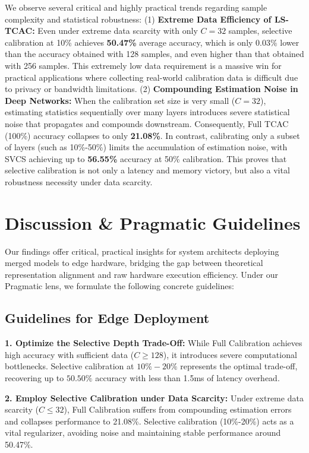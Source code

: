 \documentclass{article}
\theoremstyle{plain}
\theoremstyle{definition}
\theoremstyle{remark}
\begin{document}
We observe several critical and highly practical trends regarding sample complexity and statistical robustness:
(1) \textbf{Extreme Data Efficiency of LS-TCAC:} Even under extreme data scarcity with only $C=32$ samples, selective calibration at 10\% achieves \textbf{50.47\%} average accuracy, which is only $0.03\%$ lower than the accuracy obtained with 128 samples, and even higher than that obtained with 256 samples. This extremely low data requirement is a massive win for practical applications where collecting real-world calibration data is difficult due to privacy or bandwidth limitations.
(2) \textbf{Compounding Estimation Noise in Deep Networks:} When the calibration set size is very small ($C=32$), estimating statistics sequentially over many layers introduces severe statistical noise that propagates and compounds downstream. Consequently, Full TCAC (100\%) accuracy collapses to only \textbf{21.08\%}. In contrast, calibrating only a subset of layers (such as 10\%-50\%) limits the accumulation of estimation noise, with SVCS achieving up to \textbf{56.55\%} accuracy at 50\% calibration. This proves that selective calibration is not only a latency and memory victory, but also a vital robustness necessity under data scarcity.

\section{Discussion \& Pragmatic Guidelines}
\label{sec:discussion}
Our findings offer critical, practical insights for system architects deploying merged models to edge hardware, bridging the gap between theoretical representation alignment and raw hardware execution efficiency. Under our Pragmatic lens, we formulate the following concrete guidelines:

\subsection{Guidelines for Edge Deployment}
\textbf{1. Optimize the Selective Depth Trade-Off:} While Full Calibration achieves high accuracy with sufficient data ($C \ge 128$), it introduces severe computational bottlenecks. Selective calibration at $10\%-20\%$ represents the optimal trade-off, recovering up to $50.50\%$ accuracy with less than 1.5ms of latency overhead.

\textbf{2. Employ Selective Calibration under Data Scarcity:} Under extreme data scarcity ($C \le 32$), Full Calibration suffers from compounding estimation errors and collapses performance to 21.08\%. Selective calibration (10\%-20\%) acts as a vital regularizer, avoiding noise and maintaining stable performance around 50.47\%.
\end{document}
